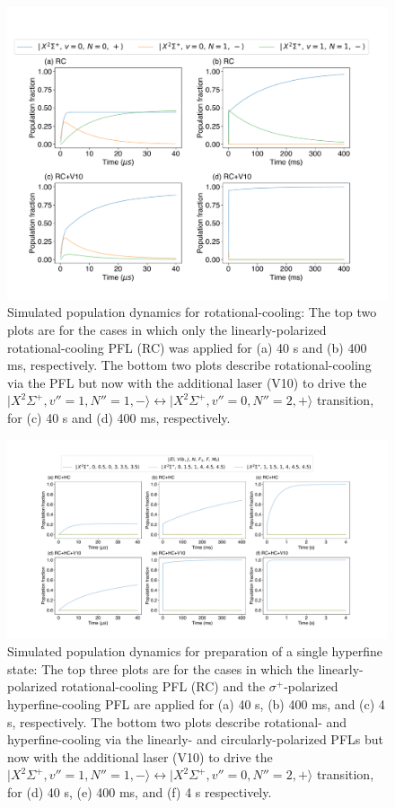 \documentclass[nofootinbib,aip,jcp,reprint]{revtex4-1}
\begin{document}
\begin{figure}[htbp!]
  \centering
  \includegraphics[width=12cm]{RC_RCV10}
  \caption
  {Simulated population dynamics for rotational-cooling: The top two plots are for the cases in which only the linearly-polarized rotational-cooling PFL (RC) was applied for (a) 40 {\micro}s and (b) 400 ms, respectively. The bottom two plots describe rotational-cooling via the PFL but now with the additional laser (V10) to drive the $\lvert X^2\Sigma^+, v''=1, N''=1, -\rangle \leftrightarrow \lvert X^2\Sigma^+, v''=0, N''=2, +\rangle$ transition, for (c) 40 {\micro}s and (d) 400 ms, respectively.
  }\label{RC_RCV10}
\end{figure}

\begin{figure}[htbp!]
  \centering
  \includegraphics[width=18cm]{RCHC_RCHCV10}
  \caption
  {Simulated population dynamics for preparation of a single hyperfine state: The top three plots are for the cases in which the linearly-polarized rotational-cooling PFL (RC) and the $\sigma^+$-polarized hyperfine-cooling PFL are applied for (a) 40 {\micro}s, (b) 400 ms, and (c) 4 s, respectively. The bottom two plots describe rotational- and hyperfine-cooling via the linearly- and circularly-polarized PFLs but now with the additional laser (V10) to drive the $\lvert X^2\Sigma^+, v''=1, N''=1, -\rangle \leftrightarrow \lvert X^2\Sigma^+, v''=0, N''=2, +\rangle$ transition, for (d) 40 {\micro}s, (e) 400 ms, and (f) 4 s  respectively.
}\label{RCHC_RCHCV10}
\end{figure}
\end{document}
